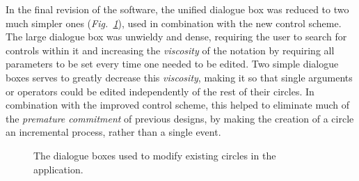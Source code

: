\documentclass[12pt,twoside,notitlepage,xetex]{report}
\begin{document}
In the final revision of the software, the unified dialogue box was reduced to two much simpler ones (\emph{Fig.~\ref{fig:Dialogues}}), used in combination with the new control scheme.  The large dialogue box was unwieldy and dense, requiring the user to search for controls within it and increasing the \emph{viscosity} of the notation by requiring all parameters to be set every time one needed to be edited.  Two simple dialogue boxes serves to greatly decrease this \emph{viscosity}, making it so that single arguments or operators could be edited independently of the rest of their circles.  In combination with the improved control scheme, this helped to eliminate much of the \emph{premature commitment} of previous designs, by making the creation of a circle an incremental process, rather than a single event.

\begin{center}
\begin{figure}[H]
\begin{center}
\end{center}
\caption{The dialogue boxes used to modify existing circles in the application.}
\label{fig:Dialogues}
\end{figure}
\end{center}
\end{document}
